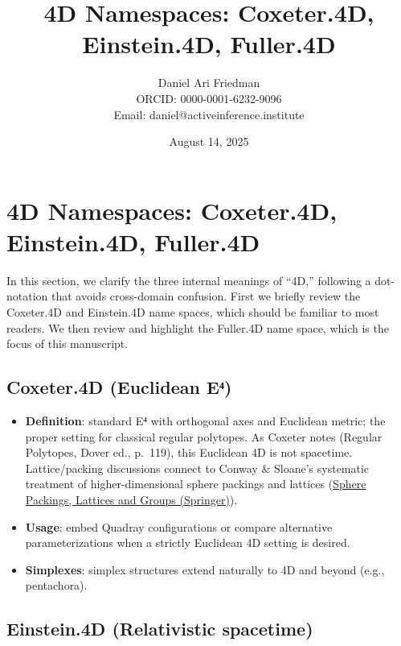 \documentclass[
  10pt,
]{article}
\title{4D Namespaces: Coxeter.4D, Einstein.4D, Fuller.4D}
\author{Daniel Ari Friedman\\ ORCID: 0000-0001-6232-9096\\ Email: daniel@activeinference.institute}
\date{August 14, 2025}
\providecommand{\tightlist}{%
  \setlength{\itemsep}{0pt}\setlength{\parskip}{0pt}}
\begin{document}
\maketitle

{
\hypersetup{linkcolor=red}
\setcounter{tocdepth}{3}
\tableofcontents
}
\hypertarget{d-namespaces-coxeter.4d-einstein.4d-fuller.4d}{%
\section{4D Namespaces: Coxeter.4D, Einstein.4D,
Fuller.4D}\label{d-namespaces-coxeter.4d-einstein.4d-fuller.4d}}

In this section, we clarify the three internal meanings of ``4D,''
following a dot-notation that avoids cross-domain confusion. First we
briefly review the Coxeter.4D and Einstein.4D name spaces, which should
be familiar to most readers. We then review and highlight the Fuller.4D
name space, which is the focus of this manuscript.

\hypertarget{coxeter.4d-euclidean-eux2074}{%
\subsection{Coxeter.4D (Euclidean
E⁴)}\label{coxeter.4d-euclidean-eux2074}}

\begin{itemize}
\tightlist
\item
  \textbf{Definition}: standard E⁴ with orthogonal axes and Euclidean
  metric; the proper setting for classical regular polytopes. As Coxeter
  notes (Regular Polytopes, Dover ed., p.~119), this Euclidean 4D is not
  spacetime. Lattice/packing discussions connect to Conway \& Sloane's
  systematic treatment of higher-dimensional sphere packings and
  lattices
  (\href{https://link.springer.com/book/10.1007/978-1-4757-6568-7}{Sphere
  Packings, Lattices and Groups (Springer)}).
\item
  \textbf{Usage}: embed Quadray configurations or compare alternative
  parameterizations when a strictly Euclidean 4D setting is desired.
\item
  \textbf{Simplexes}: simplex structures extend naturally to 4D and
  beyond (e.g., pentachora).
\end{itemize}

\hypertarget{einstein.4d-relativistic-spacetime}{%
\subsection{Einstein.4D (Relativistic
spacetime)}\label{einstein.4d-relativistic-spacetime}}
\end{document}
